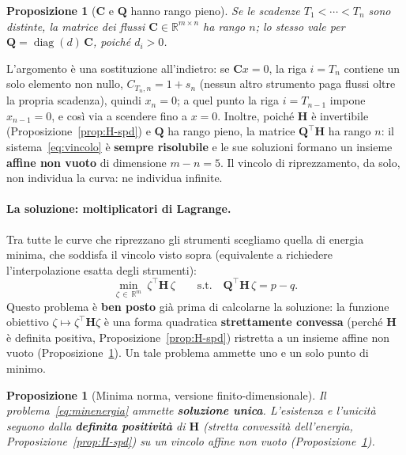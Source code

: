 \documentclass[11pt,a4paper]{article}
\theoremstyle{plain}
\newtheorem{proposizione}[teorema]{Proposizione}
\theoremstyle{definition}
\theoremstyle{remark}
\newcommand{\Qmat}{\mathbf{Q}}
\newcommand{\Hmat}{\mathbf{H}}
\newcommand{\transp}{^{\!\top}}
\begin{document}
\begin{proposizione}[$\mathbf{C}$ e $\Qmat$ hanno rango pieno]
\label{prop:rango}
Se le scadenze $T_1<\cdots<T_n$ sono distinte, la matrice dei flussi
$\mathbf{C}\in\mathbb{R}^{m\times n}$ ha rango $n$; lo stesso vale per
$\Qmat=\operatorname{diag}(d)\,\mathbf{C}$, poich\'e $d_i>0$.
\end{proposizione}

L'argomento \`e una sostituzione all'indietro: se $\mathbf{C}x=0$, la riga $i=T_n$ contiene
un solo elemento non nullo, $C_{T_n,n}=1+s_n$ (nessun altro strumento paga flussi oltre la
propria scadenza), quindi $x_n=0$; a quel punto la riga $i=T_{n-1}$ impone $x_{n-1}=0$, e
cos\`i via a scendere fino a $x=0$. Inoltre, poich\'e $\Hmat$ \`e invertibile
(Proposizione~\ref{prop:H-spd}) e $\Qmat$ ha rango pieno, la matrice $\Qmat\transp\Hmat$ ha
rango $n$: il sistema~\eqref{eq:vincolo} \`e \textbf{sempre risolubile} e le sue soluzioni
formano un insieme \textbf{affine non vuoto} di dimensione $m-n=5$. Il vincolo di
riprezzamento, da solo, non individua la curva: ne individua infinite.

\paragraph{La soluzione: moltiplicatori di Lagrange.}
Tra tutte le curve che riprezzano gli strumenti scegliamo quella di energia minima, che soddisfa
il vincolo visto sopra (equivalente a richiedere l'interpolazione esatta degli strumenti):
\begin{equation}
  \min_{\zeta\,\in\,\mathbb{R}^m} \ \zeta\transp \Hmat\, \zeta
  \qquad \text{s.t.}\quad
  \Qmat\transp \Hmat\, \zeta = p - q .
  \label{eq:minenergia}
\end{equation}
Questo problema \`e \textbf{ben posto} gi\`a prima di calcolarne la soluzione: la funzione
obiettivo $\zeta\mapsto\zeta\transp\Hmat\zeta$ \`e una forma quadratica
\textbf{strettamente convessa} (perch\'e $\Hmat$ \`e definita positiva,
Proposizione~\ref{prop:H-spd}) ristretta a un insieme affine non vuoto
(Proposizione~\ref{prop:rango}). Un tale problema ammette uno e un solo punto di minimo.

\begin{proposizione}[Minima norma, versione finito-dimensionale]
\label{prop:minnorm-finita}
Il problema~\eqref{eq:minenergia} ammette \textbf{soluzione unica}. L'esistenza e
l'unicit\`a seguono dalla \textbf{definita positivit\`a} di $\Hmat$ (stretta
convessit\`a dell'energia, Proposizione~\ref{prop:H-spd}) su un vincolo affine non vuoto
(Proposizione~\ref{prop:rango}).
\end{proposizione}
\end{document}

